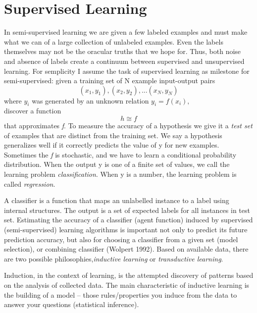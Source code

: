 \documentclass{report}
\begin{document}
\section{Supervised Learning}
In semi-supervised learning we are given a few labeled examples and must make what we can of a large collection of unlabeled examples. Even the labels themselves may not be the oracular truths that we hope for. Thus, both noise and absence of labels create a continuum between supervised and unsupervised learning.
For semplicity I assume the task of supervised learning as milestone for semi-supervised: 
given a training set of N example input-output pairs
\[(x_1,y_1), (x_2,y_2),...(x_N,y_N)\] where $y_i$ was generated by an unknown relation $y_i = f(x_i),$ \\discover a function \[h\cong f\] that approximates \textit{f}.
To measure the accuracy of a hypothesis we give it a \textit{test set} of examples that are distinct from the training set. We say a hypothesis generalizes well if it correctly predicts the value of y for new examples. Sometimes the \textit{f} is stochastic, and we have to learn a conditional probability distribution.
When the output y is one of a finite set of values, we call the learning problem \textit{classification}. When y is a number, the learning problem is called \textit{regression}.


A classifier is a function that maps an unlabelled instance to a label using internal structures. The output is a set of expected labels for all instances in test set.
Estimating the accuracy of a classifier (agent function) induced by supervised (semi-supervised) learning algorithms is important not only to predict its future prediction accuracy, but also for choosing a classifier from a given set (model selection), or combining classifier (Wolpert 1992).
Based on available data, there are two possible philosophies,\textit{inductive learning} or \textit{transductive learning}.

Induction, in the context of learning, is the attempted discovery of patterns based on the analysis of collected data. The main characteristic of inductive learning is the building of a model – those rules/properties you induce from the data to answer your questions (statistical inference).
\end{document}
